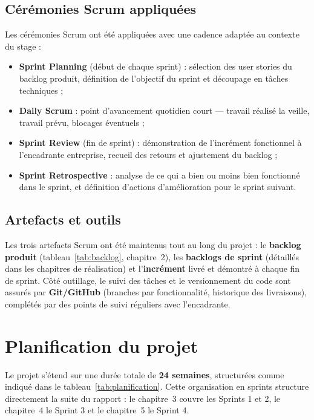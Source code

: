 \documentclass[12pt,a4paper]{report}
\begin{document}
\subsection{Cérémonies Scrum appliquées}

Les cérémonies Scrum ont été appliquées avec une cadence adaptée au contexte du stage :

\begin{itemize}
  \item \textbf{Sprint Planning} (début de chaque sprint) : sélection des user stories du backlog produit, définition de l'objectif du sprint et découpage en tâches techniques ;
  \item \textbf{Daily Scrum} : point d'avancement quotidien court --- travail réalisé la veille, travail prévu, blocages éventuels ;
  \item \textbf{Sprint Review} (fin de sprint) : démonstration de l'incrément fonctionnel à l'encadrante entreprise, recueil des retours et ajustement du backlog ;
  \item \textbf{Sprint Retrospective} : analyse de ce qui a bien ou moins bien fonctionné dans le sprint, et définition d'actions d'amélioration pour le sprint suivant.
\end{itemize}

\subsection{Artefacts et outils}

Les trois artefacts Scrum ont été maintenus tout au long du projet : le \textbf{backlog produit} (tableau~\ref{tab:backlog}, chapitre~2), les \textbf{backlogs de sprint} (détaillés dans les chapitres de réalisation) et l'\textbf{incrément} livré et démontré à chaque fin de sprint. Côté outillage, le suivi des tâches et le versionnement du code sont assurés par \textbf{Git/GitHub} (branches par fonctionnalité, historique des livraisons), complétés par des points de suivi réguliers avec l'encadrante.

\section{Planification du projet}

Le projet s'étend sur une durée totale de \textbf{24 semaines}, structurées comme indiqué dans le tableau~\ref{tab:planification}. Cette organisation en sprints structure directement la suite du rapport : le chapitre~3 couvre les Sprints 1 et 2, le chapitre~4 le Sprint 3 et le chapitre~5 le Sprint 4.
\end{document}
